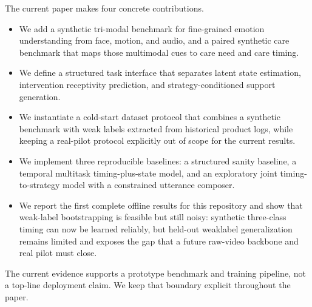 The current paper makes four concrete contributions.
\begin{itemize}[leftmargin=1.3em]
  \item We add a synthetic tri-modal benchmark for fine-grained emotion understanding from face, motion, and audio, and a paired synthetic care benchmark that maps those multimodal cues to care need and care timing.
  \item We define a structured task interface that separates latent state estimation, intervention receptivity prediction, and strategy-conditioned support generation.
  \item We instantiate a cold-start dataset protocol that combines a synthetic benchmark with weak labels extracted from historical product logs, while keeping a real-pilot protocol explicitly out of scope for the current results.
  \item We implement three reproducible baselines: a structured sanity baseline, a temporal multitask timing-plus-state model, and an exploratory joint timing-to-strategy model with a constrained utterance composer.
  \item We report the first complete offline results for this repository and show that weak-label bootstrapping is feasible but still noisy: synthetic three-class timing can now be learned reliably, but held-out weaklabel generalization remains limited and exposes the gap that a future raw-video backbone and real pilot must close.
\end{itemize}

The current evidence supports a prototype benchmark and training pipeline, not a top-line deployment claim. We keep that boundary explicit throughout the paper.

